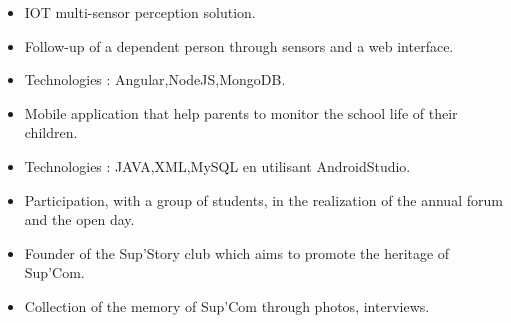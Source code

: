 \documentclass[9pt,a4paper,ragged2e,normalphoto]{altacv}
\begin{document}
\divider

\begin{itemize}
\item IOT multi-sensor perception solution.
\item Follow-up of a dependent person through sensors and a web interface.  
\item Technologies : Angular,NodeJS,MongoDB.
\end{itemize}

\divider

\begin{itemize}
\item Mobile application that help parents to monitor the school life of their children.    
\item Technologies : JAVA,XML,MySQL en utilisant AndroidStudio.
\end{itemize}




{}


{}


\begin{itemize}
\item Participation, with a group of students, in the realization of the annual forum and the open day.
\end{itemize}

\divider

\begin{itemize}
\item Founder of the Sup'Story club which aims to promote the heritage of Sup'Com.
\item Collection of the memory of Sup'Com through photos, interviews.
\end{itemize}


\clearpage
\end{document}
